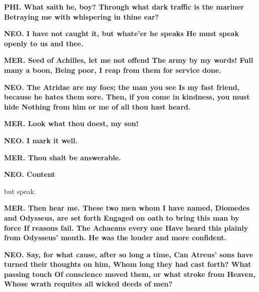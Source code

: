\documentclass[11pt,letter]{book}
\begin{document}
\par \textbf{PHI. What saith he, boy? Through what dark traffic is the mariner Betraying me with whispering in thine ear?}
\par 

\par \textbf{NEO. I have not caught it, but whate’er he speaks He must speak openly to us and thee.}
\par 

\par \textbf{MER. Seed of Achilles, let me not offend The army by my words! Full many a boon, Being poor, I reap from them for service done.}
\par 

\par \textbf{NEO. The Atridae are my foes; the man you see Is my fast friend, because he hates them sore. Then, if you come in kindness, you must hide Nothing from him or me of all thou hast heard.}
\par 

\par \textbf{MER. Look what thou doest, my son!}
\par 

\par \textbf{NEO. I mark it well.}
\par 

\par \textbf{MER. Thou shalt be answerable.}
\par 

\par \textbf{NEO. Content}
\par   but speak.

\par \textbf{MER. Then hear me. These two men whom I have named, Diomedes and Odysseus, are set forth Engaged on oath to bring this man by force If reasons fail. The Achaeans every one Have heard this plainly from Odysseus’ mouth. He was the louder and more confident.}
\par 

\par \textbf{NEO. Say, for what cause, after so long a time, Can Atreus’ sons have turned their thoughts on him, Whom long they had cast forth? What passing touch Of conscience moved them, or what stroke from Heaven, Whose wrath requites all wicked deeds of men?}
\par 
\end{document}
